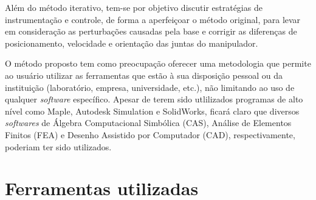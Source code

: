 Além do método iterativo, tem-se por objetivo discutir estratégias de
instrumentação e controle, de forma a aperfeiçoar o método original, para levar
em consideração as perturbações causadas pela base e corrigir as diferenças de
posicionamento, velocidade e orientação das juntas do manipulador.

O método proposto tem como preocupação oferecer uma metodologia que permite ao
usuário utilizar as ferramentas que estão à sua disposição pessoal ou da
instituição (laboratório, empresa, universidade, etc.), não limitando ao uso de
qualquer \textit{software} específico. Apesar de terem sido utlilizados
programas de alto nível como Maple, Autodesk Simulation e SolidWorks, ficará
claro que diversos \textit{softwares} de Álgebra Computacional Simbólica (CAS),
Análise de Elementos Finitos (FEA) e Desenho Assistido por Computador (CAD),
respectivamente, poderiam ter sido utilizados.


\section{Ferramentas utilizadas}
